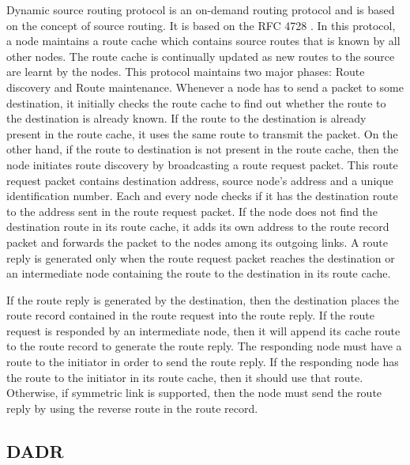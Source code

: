 \documentclass[11pt,final,onecolumn]{IEEEtran}
\begin{document}
Dynamic source routing protocol is an on-demand routing protocol and is based on the concept of source routing. It is based on the RFC 4728 \cite{Johnson2007} . In this protocol, a node maintains a route cache which contains source routes that is known by all other nodes. The route cache is continually updated as new routes to the source are learnt by the nodes. This protocol maintains two major phases: Route discovery and Route maintenance. Whenever a node has to send a packet to some destination, it initially checks the route cache to find out whether the route to the destination is already known. If the route to the destination is already present in the route cache, it uses the same route to transmit the packet. On the other hand, if the route to destination is not present in the route cache, then the node initiates route discovery by broadcasting a route request packet. This route request packet contains destination address, source node’s address and a unique identification number. Each and every node checks if it has the destination route to the address sent in the route request packet. If the node does not find the destination route in its route cache, it adds its own address to the route record packet and forwards the packet to the nodes among its outgoing links. A route reply is generated only when the route request packet reaches the destination or an intermediate node containing the route to the destination in its route cache. 
	
If the route reply is generated by the destination, then the destination places the route record contained in the route request into the route reply. If the route request is responded by an intermediate node, then it will append its cache route to the route record to generate the route reply. The responding node must have a route to the initiator in order to send the route reply. If the responding node has the route to the initiator in its route cache, then it should use that route. Otherwise, if symmetric link is supported, then the node must send the route reply by using the reverse route in the route record. 

\subsection{DADR}\label{dadr}
\end{document}
